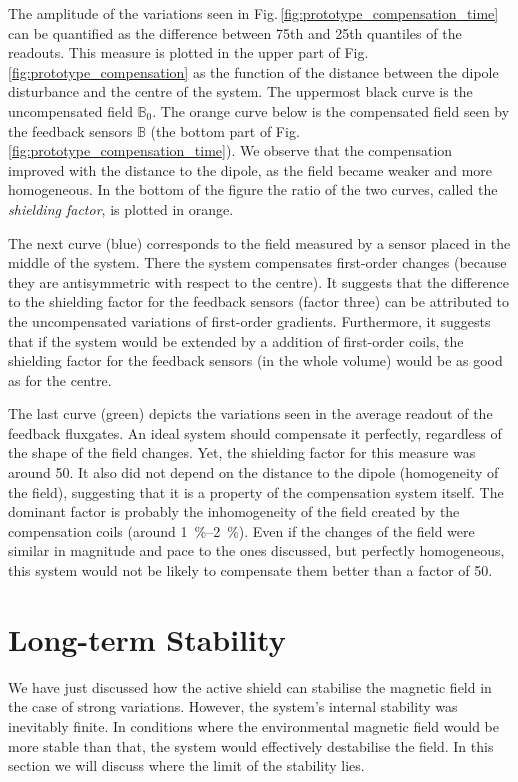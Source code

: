 The amplitude of the variations seen in Fig.\,\ref{fig:prototype_compensation_time} can be quantified as the difference between 75th and 25th quantiles of the readouts.
This measure is plotted in the upper part of Fig.\,\ref{fig:prototype_compensation} as the function of the distance between the dipole disturbance and the centre of the system.
The uppermost black curve is the uncompensated field $\mathbb{B}_0$.
The orange curve below is the compensated field seen by the feedback sensors $\mathbb{B}$ (the bottom part of Fig.\,\ref{fig:prototype_compensation_time}).
We observe that the compensation improved with the distance to the dipole, as the field became weaker and more homogeneous.
In the bottom of the figure the ratio of the two curves, called the \emph{shielding factor}, is plotted in orange.

The next curve (blue) corresponds to the field measured by a sensor placed in the middle of the system.
There the system compensates first-order changes (because they are antisymmetric with respect to the centre).
It suggests that the difference to the shielding factor for the feedback sensors (factor three) can be attributed to the uncompensated variations of first-order gradients.
Furthermore, it suggests that if the system would be extended by a addition of first-order coils, the shielding factor for the feedback sensors (in the whole volume) would be as good as for the centre.

The last curve (green) depicts the variations seen in the average readout of the feedback fluxgates.
An ideal system should compensate it perfectly, regardless of the shape of the field changes.
Yet, the shielding factor for this measure was around 50.
It also did not depend on the distance to the dipole (homogeneity of the field), suggesting that it is a property of the compensation system itself.
The dominant factor is probably the inhomogeneity of the field created by the compensation coils (around \SIrange[range-phrase=--,range-units=single]{1}{2}{\percent}).
Even if the changes of the field were similar in magnitude and pace to the ones discussed, but perfectly homogeneous, this system would not be likely to compensate them better than a factor of 50.




\section{Long-term Stability}
We have just discussed how the active shield can stabilise the magnetic field in the case of strong variations.
However, the system's internal stability was inevitably finite. In conditions where the environmental magnetic field would be more stable than that, the system would effectively destabilise the field.
In this section we will discuss where the limit of the stability lies.

